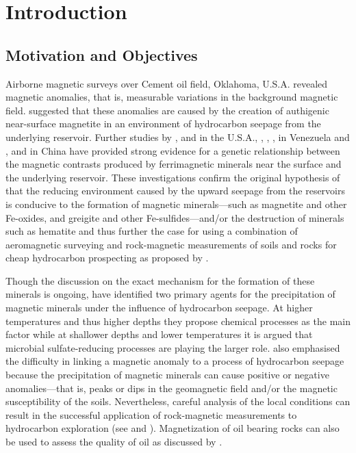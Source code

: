 
\chapter{Introduction}

\section{Motivation and Objectives}

Airborne magnetic surveys over Cement oil field, Oklahoma, U.S.A. \citep{Donovan} revealed magnetic anomalies, that is, measurable variations in the background magnetic field. \citet{Donovan} suggested that these anomalies are caused by the creation of authigenic near-surface magnetite in an environment of hydrocarbon seepage from the underlying reservoir. Further studies by \citet{Donovan2}, \citet{Reynolds} and \citet{Elmore} in the U.S.A., \citet{Diaz}, \citet{Costanzo}, \citet{Guzman}, \citet{Gonzalez} in Venezuela and \citet{Liu3}, \citet{Liu2} and \citet{Liu} in China have provided strong evidence for a genetic relationship between the magnetic contrasts produced by ferrimagnetic minerals near the surface and the underlying reservoir. These investigations confirm the original hypothesis of \citet{Donovan} that the reducing environment caused by the upward seepage from the reservoirs is conducive to the formation of magnetic minerals---such as magnetite and other Fe-oxides, and greigite and other Fe-sulfides---and/or the destruction of minerals such as hematite \citep{Machel} and thus further the case for using a combination of aeromagnetic surveying and rock-magnetic measurements of soils and rocks for cheap hydrocarbon prospecting as proposed by \citet{Donovan2}.\par

Though the discussion on the exact mechanism for the formation of these minerals is ongoing, \citet{Machel} have identified two primary agents for the precipitation of magnetic minerals under the influence of hydrocarbon seepage. At higher temperatures and thus higher depths they propose chemical processes as the main factor while at shallower depths and lower temperatures it is argued that microbial sulfate-reducing processes are playing the larger role. \citet{Machel} also emphasised the difficulty in linking a magnetic anomaly to a process of hydrocarbon seepage because the precipitation of magnetic minerals can cause positive or negative anomalies---that is, peaks or dips in the geomagnetic field and/or the magnetic susceptibility of the soils. Nevertheless, careful analysis of the local conditions can result in the successful application of rock-magnetic measurements to hydrocarbon exploration (see \citet{Liu} and \citet{Donovan2}). Magnetization of oil bearing rocks can also be used to assess the quality of oil as discussed by \citet{Emmerton}.\par

